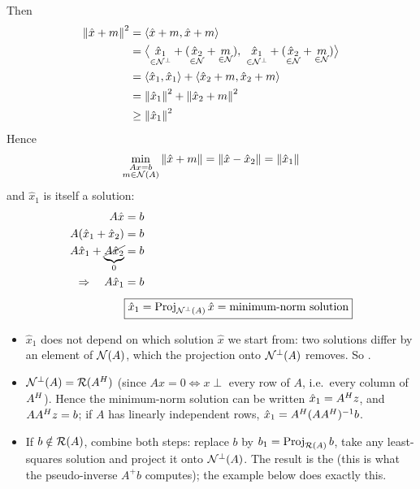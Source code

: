 Then
\begin{align*}
\norm{\hat x + m}^2 &= \inner{\hat x + m}{\hat x + m}\\
&= \big\langle \underset{\in\Null^\perp}{\hat x_1} + (\underset{\in\Null}{\hat x_2} + \underset{\in\Null}{m}),\ \underset{\in\Null^\perp}{\hat x_1} + (\underset{\in\Null}{\hat x_2} + \underset{\in\Null}{m})\big\rangle\\
&= \inner{\hat x_1}{\hat x_1} + \inner{\hat x_2 + m}{\hat x_2 + m}\\
&= \norm{\hat x_1}^2 + \norm{\hat x_2 + m}^2\\
&\geq \norm{\hat x_1}^2
\end{align*}
Hence
\begin{gather*}
\min_{\substack{Ax=b\\ m\in\mathcal{N}(A)}} \left\lVert \hat x + m \right\rVert = \left\lVert \hat x - \hat x_2 \right\rVert = \left\lVert \hat x_1 \right\rVert
\end{gather*}
and $\hat x_1$ is itself a solution:
\begin{align*}
A\hat x &= b\\
A(\hat x_1 + \hat x_2) &= b\\
A\hat x_1 + \underbrace{\cancel{A\hat x_2}}_{0} &= b\\
\Rightarrow\quad A\hat x_1 &= b\\[4pt]
&\boxed{\hat x_1 = \operatorname{Proj}_{\mathcal{N}^\perp(A)}\hat x = \text{minimum-norm solution}}
\end{align*}
\begin{insight}
\begin{itemize}[nosep]
  \item $\hat x_1$ does not depend on which solution $\hat x$ we start from: two solutions differ by an element
        of $\mathcal{N}(A)$, which the projection onto $\mathcal{N}^\perp(A)$ removes. So .
  \item $\mathcal{N}^\perp(A) = \mathcal{R}(A^{H})$ (since $Ax=0 \iff x\perp$ every row of $A$, i.e.\ every column of $A^{H}$).
        Hence the minimum-norm solution can be written $\hat x_1 = A^{H} z$, and $AA^{H} z = b$; if $A$ has
        linearly independent rows, $\hat x_1 = A^{H}(AA^{H})^{-1}b$.
  \item If $b\notin\mathcal{R}(A)$, combine both steps: replace $b$ by $b_1 = \operatorname{Proj}_{\mathcal{R}(A)}b$, take any
        least-squares solution and project it onto $\mathcal{N}^\perp(A)$. The result is the  (this is what the pseudo-inverse $A^{+}b$ computes); the example below does exactly this.
\end{itemize}
\end{insight}

